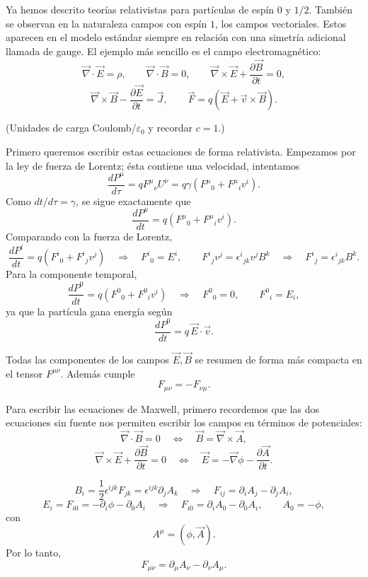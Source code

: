 \documentclass[11pt,a4paper]{article}
\begin{document}
Ya hemos descrito teorías relativistas para partículas de espín $0$ y $1/2$.
También se observan en la naturaleza campos con espín $1$, los campos
vectoriales. Estos aparecen en el modelo estándar siempre en relación con una
simetría adicional llamada de gauge. El ejemplo más sencillo es el campo
electromagnético:
\[
  \vec\nabla\cdot\vec E=\rho,
  \qquad
  \vec\nabla\cdot\vec B=0,
  \qquad
  \vec\nabla\times\vec E+\frac{\partial\vec B}{\partial t}=0,
\]
\[
  \vec\nabla\times\vec B-\frac{\partial\vec E}{\partial t}=\vec J,
  \qquad
  \vec F=q\left(\vec E+\vec v\times\vec B\right).
\]

(Unidades de carga Coulomb/$\varepsilon_0$ y recordar $c=1$.)

Primero queremos escribir estas ecuaciones de forma relativista. Empezamos por
la ley de fuerza de Lorentz; ésta contiene una velocidad, intentamos
\[
  \boxed{
  \frac{dP^\mu}{d\tau}=qF^\mu{}_{\nu}U^\nu
  }
  =q\gamma\left(F^\mu{}_{0}+F^\mu{}_{i}v^i\right).
\]
Como $dt/d\tau=\gamma$, se sigue exactamente que
\[
  \frac{dP^\mu}{dt}=q\left(F^\mu{}_{0}+F^\mu{}_{i}v^i\right).
\]
Comparando con la fuerza de Lorentz,
\[
  \frac{dP^i}{dt}= q\left(F^i{}_{0}+F^i{}_{j}v^j\right)
  \quad\Longrightarrow\quad
  F^i{}_{0}=E^i,
  \qquad
  F^i{}_{j}v^j=\epsilon^i{}_{jk}v^jB^k
  \quad\Longrightarrow\quad
  F^i{}_{j}=\epsilon^i{}_{jk}B^k.
\]
Para la componente temporal,
\[
  \frac{dP^0}{dt}= q\left(F^0{}_{0}+F^0{}_{i}v^i\right)
  \quad\Longrightarrow\quad
  F^0{}_{0}=0,
  \qquad
  F^0{}_{i}=E_i,
\]
ya que la partícula gana energía según
\[
  \frac{dP^0}{dt}=q\,\vec E\cdot\vec v.
\]

Todas las componentes de los campos $\vec E,\vec B$ se resumen de forma más
compacta en el tensor $F^{\mu\nu}$. Además cumple
\[
  F_{\mu\nu}=-F_{\nu\mu}.
\]

Para escribir las ecuaciones de Maxwell, primero recordemos que las dos
ecuaciones sin fuente nos permiten escribir los campos en términos de
potenciales:
\[
  \vec\nabla\cdot\vec B=0
  \quad\Longleftrightarrow\quad
  \vec B=\vec\nabla\times\vec A,
\]
\[
  \vec\nabla\times\vec E+\frac{\partial\vec B}{\partial t}=0
  \quad\Longleftrightarrow\quad
  \vec E=-\vec\nabla\phi-\frac{\partial\vec A}{\partial t}.
\]

\[
  B_i=\frac12\epsilon^{ijk}F_{jk}
  =\epsilon^{ijk}\partial_jA_k
  \quad\Longrightarrow\quad
  F_{ij}=\partial_iA_j-\partial_jA_i,
\]
\[
  E_i=F_{i0}=-\partial_i\phi-\partial_0A_i
  \quad\Longrightarrow\quad
  F_{i0}=\partial_iA_0-\partial_0A_i,
  \qquad A_0=-\phi,
\]
con
\[
  A^\mu=(\phi,\vec A).
\]
Por lo tanto,
\[
  \boxed{F_{\mu\nu}=\partial_\mu A_\nu-\partial_\nu A_\mu}.
\]
\end{document}
